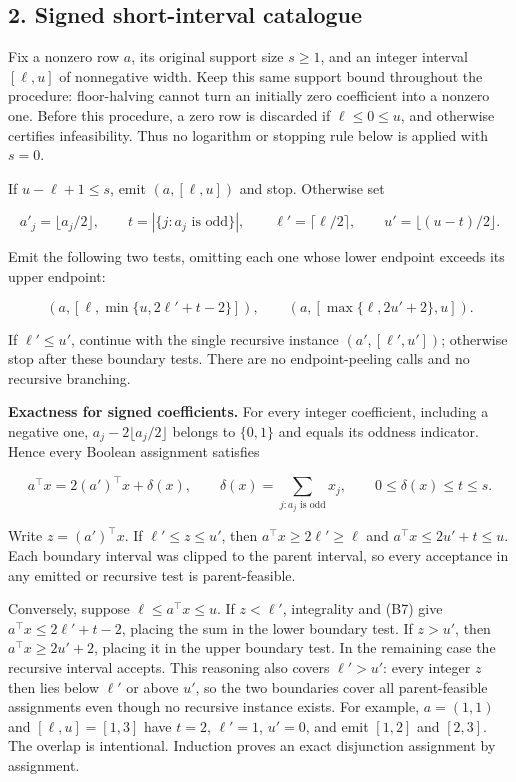 \hypertarget{af-77b0bb6793-signed-short-interval-catalogue}{%
\subsection{2. Signed short-interval catalogue}\label{af-77b0bb6793-signed-short-interval-catalogue}}

Fix a nonzero row \(a\), its original support size \(s\ge1\), and an integer interval \([\ell,u]\) of nonnegative width. Keep this same support bound throughout the procedure: floor-halving cannot turn an initially zero coefficient into a nonzero one. Before this procedure, a zero row is discarded if \(\ell\le0\le u\), and otherwise certifies infeasibility. Thus no logarithm or stopping rule below is applied with \(s=0\).

If \(u-\ell+1\le s\), emit \((a,[\ell,u])\) and stop. Otherwise set

\[
a'_j=\lfloor a_j/2\rfloor,\qquad
t=|\{j:a_j\text{ is odd}\}|,\qquad
\ell'=\lceil\ell/2\rceil,\qquad
u'=\lfloor(u-t)/2\rfloor.
\tag{B6}
\]

Emit the following two tests, omitting each one whose lower endpoint exceeds its upper endpoint:

\[
\left(a,\left[\ell,\min\{u,2\ell'+t-2\}\right]\right),
\qquad
\left(a,\left[\max\{\ell,2u'+2\},u\right]\right).
\]

If \(\ell'\le u'\), continue with the single recursive instance \((a',[\ell',u'])\); otherwise stop after these boundary tests. There are no endpoint-peeling calls and no recursive branching.

\textbf{Exactness for signed coefficients.} For every integer coefficient, including a negative one, \(a_j-2\lfloor a_j/2\rfloor\) belongs to \(\{0,1\}\) and equals its oddness indicator. Hence every Boolean assignment satisfies

\[
a^\top x=2(a')^\top x+\delta(x),\qquad
\delta(x)=\sum_{j:a_j\text{ is odd}}x_j,\qquad
0\le\delta(x)\le t\le s.
\tag{B7}
\]

Write \(z=(a')^\top x\). If \(\ell'\le z\le u'\), then \(a^\top x\ge2\ell'\ge\ell\) and \(a^\top x\le2u'+t\le u\). Each boundary interval was clipped to the parent interval, so every acceptance in any emitted or recursive test is parent-feasible.

Conversely, suppose \(\ell\le a^\top x\le u\). If \(z<\ell'\), integrality and (B7) give \(a^\top x\le2\ell'+t-2\), placing the sum in the lower boundary test. If \(z>u'\), then \(a^\top x\ge2u'+2\), placing it in the upper boundary test. In the remaining case the recursive interval accepts. This reasoning also covers \(\ell'>u'\): every integer \(z\) then lies below \(\ell'\) or above \(u'\), so the two boundaries cover all parent-feasible assignments even though no recursive instance exists. For example, \(a=(1,1)\) and \([\ell,u]=[1,3]\) have \(t=2\), \(\ell'=1\), \(u'=0\), and emit \([1,2]\) and \([2,3]\). The overlap is intentional. Induction proves an exact disjunction assignment by assignment.

